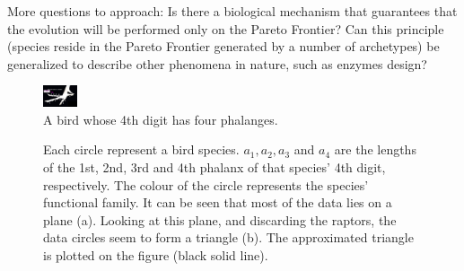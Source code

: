 \documentclass{article}
\theoremstyle{definition}
\theoremstyle{remark}
\begin{document}
More questions to approach:
Is there a biological mechanism that guarantees that the evolution will be performed only on the Pareto Frontier?
Can this principle (species reside in the Pareto Frontier generated by a number of archetypes) 
be generalized to describe other phenomena in nature, such as enzymes design?

\pagebreak

\begin{figure}
\includegraphics[width=0.4in]{bones.png}
\caption{A bird whose 4th digit has four phalanges.}

\label{fig:bones}
\end{figure}

\begin{figure}
\centering
{}
\caption{Each circle represent a bird species. $a_1, a_2, a_3$ and $a_4$ are the lengths of the 1st, 2nd, 3rd and 4th phalanx of that species' 4th digit, respectively. The colour of the circle represents the species' functional family. It can be seen that most of the data lies on a plane (a). Looking at this plane, and discarding the raptors, the data circles seem to form a triangle (b). The approximated triangle is plotted on the figure (black solid line).} 

\label{fig:birds}
\end{figure}



\end{document}
